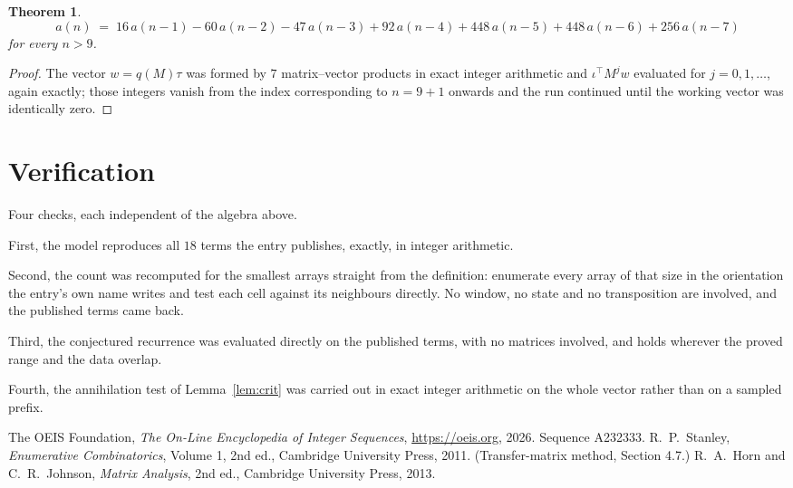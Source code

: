 \documentclass[11pt,a4paper]{article}
\theoremstyle{plain}
\newtheorem{theorem}{Theorem}
\theoremstyle{definition}
\begin{document}
\begin{theorem}
\[
a(n)\;=\;16\,a(n-1) - 60\,a(n-2) - 47\,a(n-3) + 92\,a(n-4) + 448\,a(n-5) + 448\,a(n-6) + 256\,a(n-7)
\]
for every $n>9$.
\end{theorem}

\begin{proof}
The vector $w=q(M)\tau$ was formed by $7$ matrix--vector products in exact integer
arithmetic and $\iota^{\!\top}M^{j}w$ evaluated for $j=0,1,\dots$, again exactly; those
integers vanish from the index corresponding to $n=9+1$ onwards and the run continued
until the working vector was identically zero.
\end{proof}

\section{Verification}

Four checks, each independent of the algebra above.

First, the model reproduces all $18$ terms the entry publishes, exactly, in integer
arithmetic.

Second, the count was recomputed for the smallest arrays straight from the definition:
enumerate every array of that size in the orientation the entry's own name writes and test each
cell against its neighbours directly. No window, no state and no transposition are involved,
and the published terms came back.

Third, the conjectured recurrence was evaluated directly on the published terms, with no
matrices involved, and holds wherever the proved range and the data overlap.

Fourth, the annihilation test of Lemma~\ref{lem:crit} was carried out in exact integer
arithmetic on the whole vector rather than on a sampled prefix.

\begin{thebibliography}{9}
 The OEIS Foundation, \emph{The On-Line Encyclopedia of Integer
Sequences}, \url{https://oeis.org}, 2026. Sequence A232333.
 R.~P.~Stanley, \emph{Enumerative Combinatorics}, Volume 1, 2nd ed.,
Cambridge University Press, 2011. (Transfer-matrix method, Section 4.7.)
 R.~A.~Horn and C.~R.~Johnson, \emph{Matrix Analysis}, 2nd ed., Cambridge
University Press, 2013.
\end{thebibliography}
\end{document}
